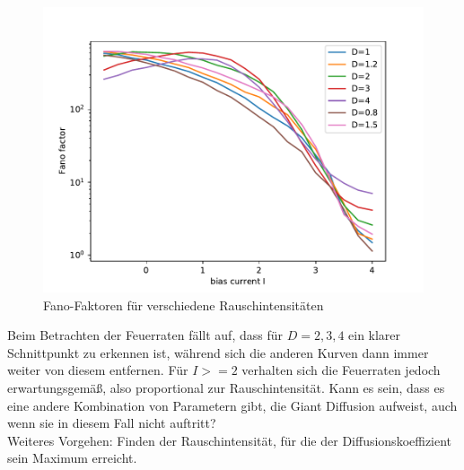 \documentclass[12pt,a4paper]{article}
\begin{document}
\begin{figure}[H]
	\centering
	\includegraphics[scale=0.9]{fneurpm.pdf} 
	\caption{Fano-Faktoren für verschiedene Rauschintensitäten}
	\label{fnp}
\end{figure} 
Beim Betrachten der Feuerraten fällt auf, dass für $D=2,3,4$ ein klarer Schnittpunkt zu erkennen ist, während sich die anderen Kurven dann immer weiter von diesem entfernen. Für $I>=2$ verhalten sich die Feuerraten jedoch erwartungsgemäß, also proportional zur Rauschintensität. Kann es sein, dass es eine andere Kombination von Parametern gibt, die Giant Diffusion aufweist, auch wenn sie in diesem Fall nicht auftritt?\\
Weiteres Vorgehen: Finden der Rauschintensität, für die der Diffusionskoeffizient sein Maximum erreicht. 
\end{document}
